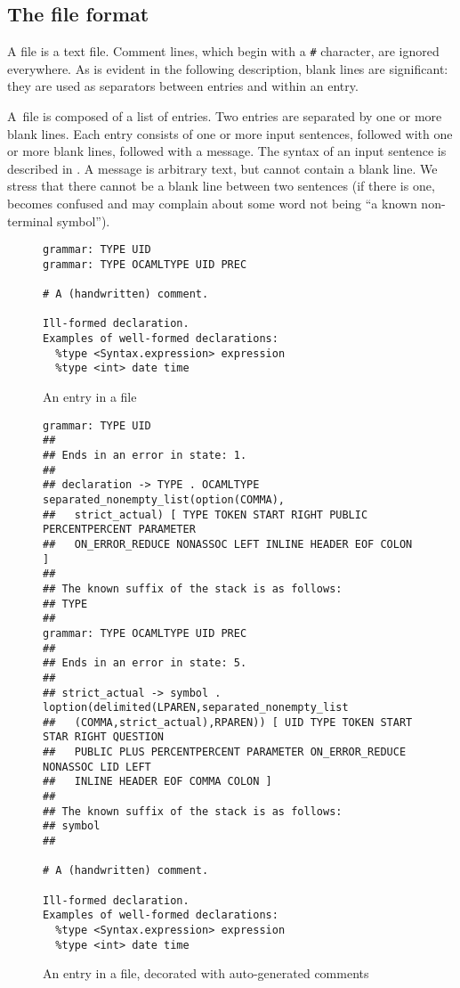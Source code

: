 \documentclass[onecolumn,11pt,nocopyrightspace,preprint]{sigplanconf}
\begin{document}
\subsection{The \messages file format}
\label{sec:messages:format}

A \messages file is a text file. Comment lines, which begin with a \verb+#+
character, are ignored everywhere. As is evident in the following description,
blank lines are significant: they are used as separators between entries and
within an entry.

A~\messages file is composed of a list of entries. Two entries are separated
by one or more blank lines. Each entry consists of one or more input
sentences, followed with one or more blank lines, followed with a message. The
syntax of an input sentence is described in . A message is
arbitrary text, but cannot contain a blank line. We stress that there cannot
be a blank line between two sentences (if there is one, \menhir becomes confused
and may complain about some word not being ``a known non-terminal symbol'').

\begin{figure}
\begin{verbatim}
grammar: TYPE UID
grammar: TYPE OCAMLTYPE UID PREC

# A (handwritten) comment.

Ill-formed declaration.
Examples of well-formed declarations:
  %type <Syntax.expression> expression
  %type <int> date time
\end{verbatim}
\caption{An entry in a \messages file}
\label{fig:messages:entry}
\end{figure}

\begin{figure}
\begin{verbatim}
grammar: TYPE UID
##
## Ends in an error in state: 1.
##
## declaration -> TYPE . OCAMLTYPE separated_nonempty_list(option(COMMA),
##   strict_actual) [ TYPE TOKEN START RIGHT PUBLIC PERCENTPERCENT PARAMETER
##   ON_ERROR_REDUCE NONASSOC LEFT INLINE HEADER EOF COLON ]
##
## The known suffix of the stack is as follows:
## TYPE
##
grammar: TYPE OCAMLTYPE UID PREC
##
## Ends in an error in state: 5.
##
## strict_actual -> symbol . loption(delimited(LPAREN,separated_nonempty_list
##   (COMMA,strict_actual),RPAREN)) [ UID TYPE TOKEN START STAR RIGHT QUESTION
##   PUBLIC PLUS PERCENTPERCENT PARAMETER ON_ERROR_REDUCE NONASSOC LID LEFT
##   INLINE HEADER EOF COMMA COLON ]
##
## The known suffix of the stack is as follows:
## symbol
##

# A (handwritten) comment.

Ill-formed declaration.
Examples of well-formed declarations:
  %type <Syntax.expression> expression
  %type <int> date time
\end{verbatim}
\caption{An entry in a \messages file, decorated with auto-generated comments}
\label{fig:messages:entry:decorated}
\end{figure}
\end{document}
